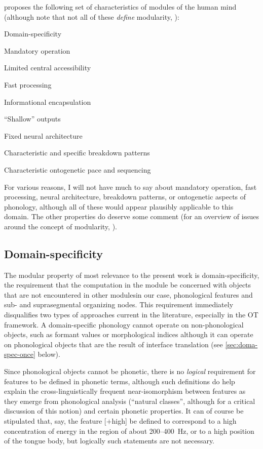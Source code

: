 \citet{fodor83:_modul} proposes the following set of characteristics of modules of the human mind (although note that not all of these \emph{define} modularity, \cf \citealt{coltheart99:_modul}):

\begin{enumerate*}
\item Domain\hyp specificity
\item Mandatory operation
\item Limited central accessibility
\item Fast processing
\item Informational encapsulation
\item \enquote{Shallow} outputs
\item Fixed neural architecture
\item Characteristic and specific breakdown patterns
\item Characteristic ontogenetic pace and sequencing
\end{enumerate*}

For various reasons, I will not have much to say about mandatory operation, fast processing, neural architecture, breakdown patterns, or ontogenetic aspects of phonology, although all of these would appear plausibly applicable to this domain. The other properties do deserve some comment (for an overview of issues around the concept of modularity, \citealp[\cf][]{sep-modularity-mind}).

\subsection{Domain-specificity}
\label{sec:domain-specificity}

The modular property of most relevance to the present work is domain\hyp specificity, \ie the requirement that the computation in the module be concerned with objects that are not encountered in other modules\dash in our case, phonological features and sub- and suprasegmental organizing nodes. This requirement immediately disqualifies two types of approaches current in the literature, especially in the OT framework. A domain\hyp specific phonology cannot operate on non\hyp phonological objects, such as formant values \citep[\egm][]{flemming1995} or morphological indices \citep[\egm][]{pater00:_non_englis,pater09:_morph}\dash although it can operate on phonological objects that are the result of interface translation (see \cref{sec:doma-spec-once} below).

Since phonological objects cannot be phonetic, there is no \emph{logical} requirement for features to be defined in phonetic terms, although such definitions do help explain the cross\hyp linguistically frequent near\hyp isomorphism between features as they emerge from phonological analysis (\enquote{natural classes}, although \cf \citealt{mielke-diss} for a critical discussion of this notion) and certain phonetic properties. It can of course be stipulated that, say, the feature [$+$high] be defined to correspond to a high concentration of energy in the region of about 200--400~Hz, or to a high position of the tongue body, but logically such statements are not necessary.

